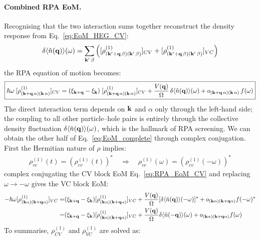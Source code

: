 \documentclass[11pt,letterpaper]{article}
\theoremstyle{definition}
\theoremstyle{plain}
\theoremstyle{remark}
\newcommand{\avg}[1]{\langle #1 \rangle}%
\begin{document}
\paragraph{Combined RPA EoM.}
Recognising that the two interaction sums together reconstruct the density response from Eq.~\eqref{eq:EoM_HEG_CV}:
\begin{gather}
    \delta\avg{\hat{n}(\vb{q})}(\omega) = \sum_{\vb{k}'\,\beta} \left([\rho^{(1)}_{(\vb{k}'+\vb{q}\,\beta)(\vb{k}'\,\beta)}]_{CV} + [\rho^{(1)}_{(\vb{k}'+\vb{q}\,\beta)(\vb{k}'\,\beta)}]_{VC}\right) \label{eq:LR_electron_density}
\end{gather}
the RPA equation of motion becomes:
\begin{gather}
    \boxed{\hbar\omega\;[\rho^{(1)}_{(\vb{k}+\vb{q}\,\alpha)(\vb{k}\,\alpha)}]_{CV} = (\xi_{\vb{k}+\vb{q}} - \xi_{\vb{k}})\;[\rho^{(1)}_{(\vb{k}+\vb{q}\,\alpha)(\vb{k}\,\alpha)}]_{CV} + \frac{V(\vb{q})}{\Omega}\,\delta\avg{\hat{n}(\vb{q})}(\omega) + o_{(\vb{k}+\vb{q}\,\alpha)(\vb{k}\,\alpha)}\,f(\omega)} \label{eq:RPA_EoM_CV}
\end{gather}
The direct interaction term depends on $\vb{k}$ and $\alpha$ only through the left-hand side; the coupling to all other particle--hole pairs is entirely through the collective density fluctuation $\delta\avg{\hat{n}(\vb{q})}(\omega)$, which is the hallmark of RPA screening. We can obtain the other half of Eq.~\eqref{eq:EoM_complete} through complex conjugation. First the Hermitian nature of $\rho$ implies:
\begin{gather}
    \rho^{(1)}_{vc} (t) = (\rho^{(1)}_{cv} (t))^* \quad \Rightarrow \quad \rho^{(1)}_{vc}(\omega) = (\rho^{(1)}_{cv}(-\omega))^*
\end{gather}
complex conjugating the CV block EoM Eq.~\eqref{eq:RPA_EoM_CV} and replacing $\omega \to -\omega$ gives the VC block EoM:
\begin{align}
    -\hbar \omega [\rho^{(1)}_{(\vb{k} \alpha)(\vb{k} + \vb{q} \alpha)}]_{VC} =& (\xi_{\vb{k} + \vb{q}} - \xi_{\vb{k}})[\rho^{(1)}_{(\vb{k} \alpha)(\vb{k} + \vb{q} \alpha)}]_{VC} + \frac{V(\vb{q})}{\Omega} [\delta\avg{\hat{n}(\vb{q})}(-\omega)]^* + o_{(\vb{k} \alpha)(\vb{k} + \vb{q} \alpha)} f(-\omega)^* \\
    =& (\xi_{\vb{k} + \vb{q}} - \xi_{\vb{k}})[\rho^{(1)}_{(\vb{k} \alpha)(\vb{k} + \vb{q} \alpha)}]_{VC} + \frac{V(\vb{q})}{\Omega} \delta\avg{\hat{n}(-\vb{q})}(\omega)+ o_{(\vb{k} \alpha)(\vb{k} + \vb{q} \alpha)} f(\omega)
\end{align}
To summarise, $\rho^{(1)}_{CV}$ and $\rho^{(1)}_{VC}$ are solved as:
\end{document}
